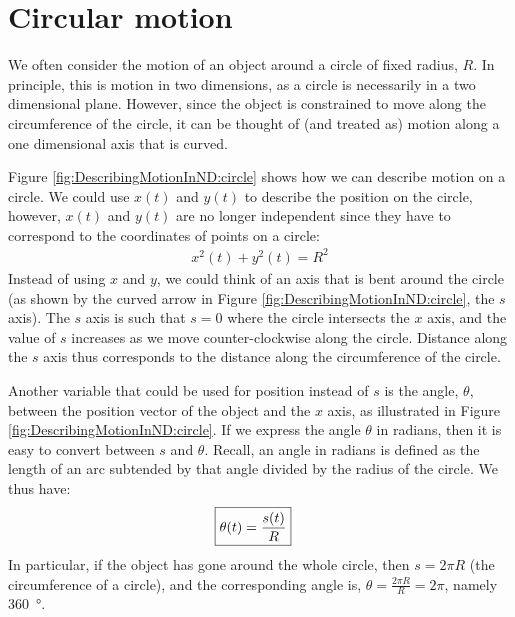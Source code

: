 \section{Circular motion}
We often consider the motion of an object around a circle of fixed radius, $R$. In principle, this is motion in two dimensions, as a circle is necessarily in a two dimensional plane. However, since the object is constrained to move along the circumference of the circle, it can be thought of (and treated as) motion along a one dimensional axis that is curved. 

Figure \ref{fig:DescribingMotionInND:circle} shows how we can describe motion on a circle. We could use $x(t)$ and $y(t)$ to describe the position on the circle, however, $x(t)$ and $y(t)$ are no longer independent since they have to correspond to the coordinates of points on a circle:
\begin{align*}
x^2(t)+y^2(t)=R^2
\end{align*}
Instead of using $x$ and $y$, we could think of an axis that is bent around the circle (as shown by the curved arrow in Figure \ref{fig:DescribingMotionInND:circle}, the $s$ axis). The $s$ axis is such that $s=0$ where the circle intersects the $x$ axis, and the value of $s$ increases as we move counter-clockwise along the circle. Distance along the $s$ axis thus corresponds to the distance along the circumference of the circle.

Another variable that could be used for position instead of $s$ is the angle, $\theta$, between the position vector of the object and the $x$ axis, as illustrated in Figure \ref{fig:DescribingMotionInND:circle}. If we express the angle $\theta$ in radians, then it is easy to convert between $s$ and $\theta$. Recall, an angle in radians is defined as the length of an arc subtended by that angle divided by the radius of the circle. We thus have:
\begin{align}
\label{eqn:DescribingMotionInND:raddef}
\Aboxed{\theta(t)=\frac{s(t)}{R}}
\end{align}
In particular, if the object has gone around the whole circle, then $s=2\pi R$ (the circumference of a circle), and the corresponding angle is, $\theta=\frac{2\pi R}{R}=2\pi$, namely \SI{360}{\degree}. 

